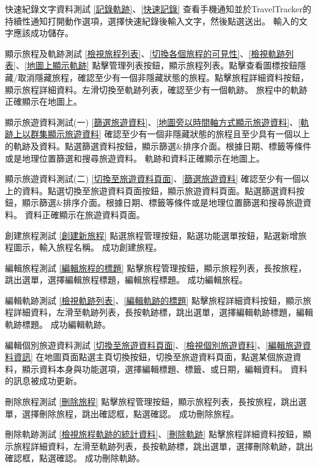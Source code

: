 \addtestcase
  {快速紀錄文字資料測試}
  {}
  {\ref{記錄軌跡}、\ref{快速記錄}}
  {查看手機通知並於TravelTracker的持續性通知打開動作選項，選擇快速紀錄後輸入文字，然後點選送出。}
  {輸入的文字應該成功儲存。}

\addtestcase
  {顯示旅程及軌跡測試}
  {}
  {\ref{檢視旅程列表}、\ref{切換各個旅程的可見性}、\ref{檢視軌跡列表}、\ref{地圖上顯示軌跡}}
  {點擊管理列表按鈕，顯示旅程列表。點擊查看圖標按鈕隱藏/取消隱藏旅程，確認至少有一個非隱藏狀態的旅程。點擊旅程詳細資料按鈕，顯示旅程詳細資料。左滑切換至軌跡列表，確認至少有一個軌跡。}
  {旅程中的軌跡正確顯示在地圖上。}

\addtestcase
  {顯示旅遊資料測試(一)}
  {}
  {\ref{篩選旅遊資料}、\ref{地圖旁以時間軸方式顯示旅遊資料}、\ref{軌跡上以群集顯示旅遊資料}}
  {確認至少有一個非隱藏狀態的旅程且至少具有一個以上的軌跡及資料。點選篩選資料按鈕，顯示篩選\&排序介面。根據日期、標籤等條件或是地理位置篩選和搜尋旅遊資料。}
  {軌跡和資料正確顯示在地圖上。}

\addtestcase
  {顯示旅遊資料測試(二)}
  {}
  {\ref{切換至旅遊資料頁面}、\ref{篩選旅遊資料}}
  {確認至少有一個以上的資料。點選切換至旅遊資料頁面按鈕，顯示旅遊資料頁面。點選篩選資料按鈕，顯示篩選\&排序介面。根據日期、標籤等條件或是地理位置篩選和搜尋旅遊資料。}
  {資料正確顯示在旅遊資料頁面。}

\addtestcase
  {創建旅程測試}
  {}
  {\ref{創建新旅程}}
  {點選旅程管理按鈕，點選功能選單按鈕，點選新增旅程圖示，輸入旅程名稱。}
  {成功創建旅程。}

\addtestcase
  {編輯旅程測試}
  {}
  {\ref{編輯旅程的標題}}
  {點擊旅程管理按鈕，顯示旅程列表，長按旅程，跳出選單，選擇編輯旅程標題，編輯旅程標題。}
  {成功編輯旅程。}

\addtestcase
  {編輯軌跡測試}
  {}
  {\ref{檢視軌跡列表}、\ref{編輯軌跡的標題}}
  {點擊旅程詳細資料按鈕，顯示旅程詳細資料，左滑至軌跡列表，長按軌跡標，跳出選單，選擇編輯軌跡標題，編輯軌跡標題。}
  {成功編輯軌跡。}

\addtestcase
  {編輯個別旅遊資料測試}
  {}
  {\ref{切換至旅遊資料頁面}、\ref{檢視個別旅遊資料}、\ref{編輯旅遊資料資訊}}
  {在地圖頁面點選主頁切換按鈕，切換至旅遊資料頁面，點選某個旅遊資料，顯示資料本身與功能選項，選擇編輯標題、標籤、或日期，編輯資料。}
  {資料的訊息被成功更新。}

\addtestcase
  {刪除旅程測試}
  {}
  {\ref{刪除旅程}}
  {點擊旅程管理按鈕，顯示旅程列表，長按旅程，跳出選單，選擇刪除旅程，跳出確認框，點選確認。}
  {成功刪除旅程。}

\addtestcase
  {刪除軌跡測試}
  {}
  {\ref{檢視旅程軌跡的統計資料}、\ref{刪除軌跡}}
  {點擊旅程詳細資料按鈕，顯示旅程詳細資料，左滑至軌跡列表，長按軌跡標，跳出選單，選擇刪除軌跡，跳出確認框，點選確認。}
  {成功刪除軌跡。}

